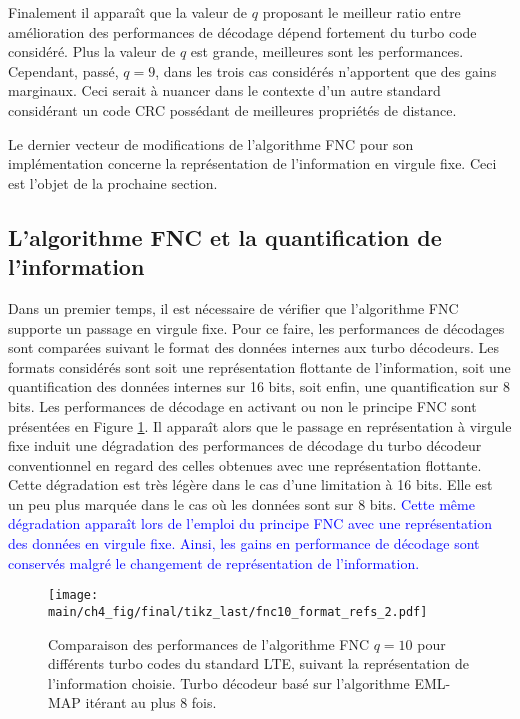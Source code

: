 Finalement il apparaît que la valeur de $q$ proposant le meilleur ratio entre amélioration des performances de décodage 
dépend fortement du turbo code considéré. Plus la valeur de $q$ est grande, meilleures sont les performances. Cependant,
passé, $q=9$, dans les trois cas considérés n'apportent que des gains marginaux. Ceci serait à nuancer dans le contexte 
d'un autre standard considérant un code CRC possédant de meilleures propriétés de distance.

Le dernier vecteur de modifications de l'algorithme FNC pour son implémentation concerne la représentation de 
l'information en virgule fixe. Ceci est l'objet de la prochaine section.

\subsection{L'algorithme FNC et la quantification de l'information}
Dans un premier temps, il est nécessaire de vérifier que l'algorithme FNC supporte un passage en virgule fixe. Pour ce 
faire, les performances de décodages sont comparées suivant le format des données internes aux turbo décodeurs. Les 
formats considérés sont soit une représentation flottante de l'information, soit une quantification des données internes 
sur 16 bits, soit enfin, une quantification sur 8 bits. Les performances de décodage en activant ou non le principe FNC 
sont présentées en Figure \ref{fig:fnc_format_refs}. Il apparaît alors que le passage en représentation à virgule fixe 
induit une dégradation des performances de décodage du turbo décodeur conventionnel en regard des celles obtenues avec 
une représentation flottante. Cette dégradation est très légère dans le cas d'une limitation à 16 bits. Elle est un peu 
plus marquée dans le cas où les données sont sur 8 bits. \textcolor{blue}{Cette même dégradation apparaît lors de 
l'emploi du principe FNC avec une représentation des données en virgule fixe. Ainsi, les gains en performance de 
décodage sont conservés malgré le changement de représentation de l'information.}

\begin{figure}[!h]
	\vspace*{-.5cm}
	\centering
	\texttt{[image: main/ch4\_fig/final/tikz\_last/fnc10\_format\_refs\_2.pdf]}
	\caption{Comparaison des performances de l'algorithme FNC $q=10$ pour différents turbo codes du standard LTE, 
	suivant la représentation de l'information choisie.
	Turbo décodeur basé sur l'algorithme EML-MAP itérant au plus 8 fois.
	\label{fig:fnc_format_refs}}
\end{figure}

